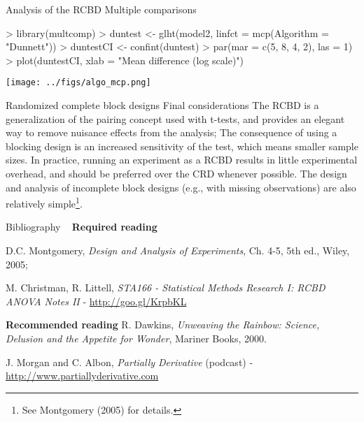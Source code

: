 \documentclass[t]{beamer}
\begin{document}
\begin{ftstf}
{Analysis of the RCBD}
{Multiple comparisons}
\begin{rcode}
> library(multcomp)
> duntest     <- glht(model2, linfct = mcp(Algorithm = "Dunnett"))
> duntestCI   <- confint(duntest)
> par(mar = c(5, 8, 4, 2), las = 1)
> plot(duntestCI, xlab = "Mean difference (log scale)")
\end{rcode}
\centering\texttt{[image: ../figs/algo\_mcp.png]}
\end{ftstf}


\begin{ftst}
{Randomized complete block designs}
{Final considerations}
The RCBD is a generalization of the pairing concept used with t-tests, and provides an elegant way to remove nuisance effects from the analysis;
\vone
The consequence of using a blocking design is an increased sensitivity of the test, which means smaller sample sizes.
\vone
In practice, running an experiment as a RCBD results in little experimental overhead, and should be preferred over the CRD whenever possible.
\vone
The design and analysis of incomplete block designs (e.g., with missing observations) are also relatively simple\footnote{\tiny See Montgomery (2005) for details.}.
\end{ftst}


\begin{ftst}
{Bibliography}
{\ }
\scriptsize
\textbf{Required reading}

\benums D.C. Montgomery, \textit{Design and Analysis of Experiments}, Ch. 4-5, 5th ed., Wiley, 2005;
\item M. Christman, R. Littell, \textit{STA166 - Statistical Methods Research I: RCBD ANOVA Notes II} - \url{http://goo.gl/KrpbKL}
\eenum

\textbf{Recommended reading}
\benums R. Dawkins, \textit{Unweaving the Rainbow: Science, Delusion and the Appetite for Wonder}, Mariner Books, 2000.
\item J. Morgan and C. Albon, \textit{Partially Derivative} (podcast) - \url{http://www.partiallyderivative.com}
\eenum
\end{ftst}

\end{document}
